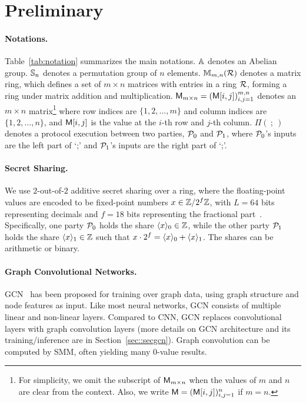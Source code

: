 \section{Preliminary}

\paragraph{Notations.}
Table~\ref{tab:notation} summarizes the main notations.
$\mathbb{A}$ denotes an Abelian group.
$\mathbb{S}_n$ denotes a permutation group of $n$ elements.
$\mathbb{M}_{m,n}(\mathcal{R})$ denotes a matrix ring, which defines a set of $m\times n$ matrices with entries in a ring $\mathcal{R}$, forming a ring under matrix addition and
multiplication.
$\mathsf{M}_{m \times n}=(\mathsf{M}[i,j])_{i,j=1}^{m,n}$ denotes an $m\times n$ matrix\footnote{
For simplicity, we omit the subscript of 
$\mathsf{M}_{m \times n}$ when the values of $m$ and $n$ are clear from the context.
Also, we write 
$\mathsf{M} = (\mathsf{M}[i, j])_{i, j = 1}^{n}$ if $m = n$.
} 
where row indices are $\{1, 2, \ldots, m\}$ and column indices are $\{1, 2, \ldots, n\}$, and $\mathsf{M}[i,j]$ is the value at the $i$-th row and $j$-th column.
$\Pi(\ ;\ )$ denotes a protocol execution between two parties, $\mathcal{P}_0$ and $\mathcal{P}_1$, where $\mathcal{P}_0$'s inputs are the left part of `;' and $\mathcal{P}_1$'s inputs are the right part of `;'.

\paragraph{Secret Sharing.} 
We use $2$-out-of-$2$ additive secret sharing over a ring, where
the floating-point
values are encoded to be fixed-point numbers $x\in \mathbb{Z}/2^f\mathbb{Z}$, with $L = 64$ bits representing decimals and $f = 18$ bits representing the fractional part~\cite{sp/MohasselZ17}.
Specifically, one party $\mathcal{P}_0$ holds the share $\langle x\rangle _0\in\mathbb{Z} $, while the other party $\mathcal{P}_1$ holds the share $\langle x\rangle_1\in\mathbb{Z}$ such that $x\cdot 2^f = \langle x\rangle_0 + \langle x\rangle_1$.
The shares can be arithmetic or binary.



\paragraph{Graph Convolutional Networks.}
GCN~\cite{iclr/KipfW17} has been proposed for training over graph data, using graph structure and node features as input.
Like most neural networks, GCN consists of multiple linear and non-linear layers.
Compared to CNN, GCN replaces convolutional layers with graph convolution layers
(more details on GCN architecture and its training/inference are in Section~\ref{sec::secgcn}).
Graph convolution can be computed by SMM, often yielding many $0$-value results.

